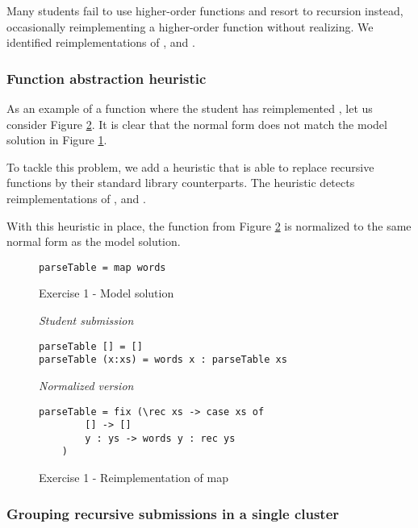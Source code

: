 Many students fail to use higher-order functions and resort to recursion instead, occasionally reimplementing a higher-order function without realizing. We identified reimplementations of ,  and .

\subsubsection{Function abstraction heuristic}

As an example of a function where the student has reimplemented , let us consider Figure \ref{fig:ex1-reimplementation-map}.  It is clear that the normal form does not match the model solution in Figure \ref{fig:ex1-model-solution}.

To tackle this problem, we add a heuristic that is able to replace recursive functions by their standard library counterparts. The heuristic detects reimplementations of ,  and .

With this heuristic in place, the function from Figure \ref{fig:ex1-reimplementation-map} is normalized to the same normal form as the model solution.

\begin{figure}
\begin{verbatim}
parseTable = map words
\end{verbatim}
\caption{Exercise 1 - Model solution}
\label{fig:ex1-model-solution}
\end{figure}

\begin{figure}
\centering
\emph{Student submission}
\begin{verbatim}
parseTable [] = []
parseTable (x:xs) = words x : parseTable xs
\end{verbatim}
\bigskip
\emph{Normalized version}
\begin{verbatim}
parseTable = fix (\rec xs -> case xs of
        [] -> []
        y : ys -> words y : rec ys
    )
\end{verbatim}
\caption{Exercise 1 - Reimplementation of map}
\label{fig:ex1-reimplementation-map}
\end{figure}


\subsubsection{Grouping recursive submissions in a single cluster}

